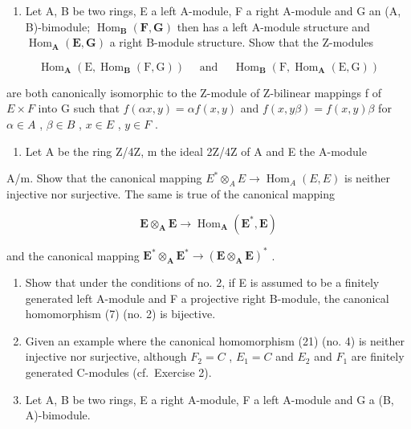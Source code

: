 \BourbakiExercisesSection

\begin{enumerate}
\def\labelenumi{\arabic{enumi}.}
\tightlist
\item
  Let A, B be two rings, E a left A-module, F a right A-module and G an (A, B)-bimodule; \(\operatorname{Hom}_{\mathbf{B}}(\mathbf{F}, \mathbf{G})\) then has a left A-module structure and \(\operatorname{Hom}_{\mathbf{A}}(\mathbf{E}, \mathbf{G})\) a right B-module structure. Show that the Z-modules
\end{enumerate}

\[
\operatorname{Hom} _ {\mathbf {A}} (\mathrm{E}, \operatorname{Hom} _ {\mathbf {B}} (\mathrm{F}, \mathrm{G})) \quad \text { and } \quad \operatorname{Hom} _ {\mathbf {B}} (\mathrm{F}, \operatorname{Hom} _ {\mathbf {A}} (\mathrm{E}, \mathrm{G}))
\]

are both canonically isomorphic to the Z-module of Z-bilinear mappings f of \(E \times F\) into G such that \(f(\alpha x, y) = \alpha f(x, y)\) and \(f(x, y\beta) = f(x, y)\beta\) for \(\alpha \in A\) , \(\beta \in B\) , \(x \in E\) , \(y \in F\) .

\begin{enumerate}
\def\labelenumi{\arabic{enumi}.}
\setcounter{enumi}{1}
\tightlist
\item
  Let A be the ring Z/4Z, m the ideal 2Z/4Z of A and E the A-module
\end{enumerate}

A/m. Show that the canonical mapping \(E^{*} \otimes_{A} E \to \operatorname{Hom}_{A}(E, E)\) is neither injective nor surjective. The same is true of the canonical mapping

\[
\mathbf {E} \otimes_ {\mathbf {A}} \mathbf {E} \rightarrow \operatorname{Hom} _ {\mathbf {A}} (\mathbf {E} ^ {*}, \mathbf {E})
\]

and the canonical mapping \(\mathbf{E}^{*}\otimes_{\mathbf{A}}\mathbf{E}^{*}\to (\mathbf{E}\otimes_{\mathbf{A}}\mathbf{E})^{*}\) .

\begin{enumerate}
\def\labelenumi{\arabic{enumi}.}
\setcounter{enumi}{2}
\item
  Show that under the conditions of no. 2, if E is assumed to be a finitely generated left A-module and F a projective right B-module, the canonical homomorphism (7) (no. 2) is bijective.
\item
  Given an example where the canonical homomorphism (21) (no. 4) is neither injective nor surjective, although \(F_{2} = C\) , \(E_{1} = C\) and \(E_{2}\) and \(F_{1}\) are finitely generated C-modules (cf.~Exercise 2).
\item
  Let A, B be two rings, E a right A-module, F a left A-module and G a (B, A)-bimodule.
\end{enumerate}

